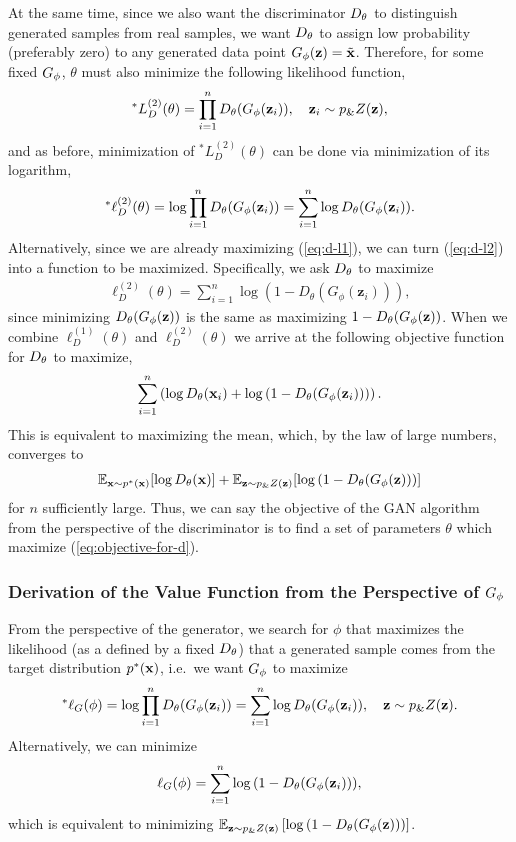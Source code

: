 At the same time, since we also want the discriminator $D_\theta$ to
distinguish generated samples from real samples, we want $D_\theta$ to
assign low probability (preferably zero) to any generated data point
$G_\phi(\mathbf{z}) = \tilde{\mathbf{x}}$.  Therefore, for some fixed $G_\phi$, $\theta$
must also minimize the following likelihood function,
\begin{align}
  ^*L_{D}^{(2)}(\theta) = \prod_{i=1}^n D_\theta(G_\phi(\mathbf{z}_i)), \quad \mathbf{z}_i \sim p_\&Z(\mathbf{z}),
\end{align}
and as before, minimization of $^*L_{D}^{(2)}(\theta)$ can be done via
minimization of its logarithm,
\begin{align}
  \label{eq:d-l2} ^*\ell_{D}^{(2)}(\theta) = \log \prod_{i=1}^n D_\theta(G_\phi(\mathbf{z}_i)) = \sum_{i=1}^n \log D_\theta (G_\phi(\mathbf{z}_i)).
\end{align}
Alternatively, since we are already maximizing (\ref{eq:d-l1}), we can
turn (\ref{eq:d-l2}) into a function to be maximized. Specifically, we
ask $D_\theta$ to maximize
\begin{align}
  \ell_{D}^{(2)}(\theta) = \sum_{i=1}^n \log{(1 - D_\theta(G_\phi(\mathbf{z}_i)))},
\end{align}
since minimizing $D_\theta(G_\phi(\mathbf{z}))$ is the same as maximizing
$1 - D_\theta(G_\phi(\mathbf{z}))$. When we combine $\ell_{D}^{(1)}(\theta)$ and
$\ell_{D}^{(2)}(\theta)$ we arrive at the following objective function
for $D_\theta$ to maximize,
\begin{align}
  \sum_{i=1}^n \left( \log D_\theta(\mathbf{x}_i) + \log{(1 - D_\theta(G_\phi(\mathbf{z}_i)))} \right).
\end{align}
This is equivalent to maximizing the mean, which, by the law of large
numbers, converges to
\begin{align}
  \label{eq:objective-for-d}
  \mathbb{E}_{\mathbf{x} \sim p^*(\mathbf{x})}[{\log D_\theta(\mathbf{x}})] + \mathbb{E}_{\mathbf{z} \sim p_\&Z(\mathbf{z})}[\log{(1 - D_\theta(G_\phi(\mathbf{z})))}]
\end{align}
for $n$ sufficiently large. Thus, we can say the objective of the GAN
algorithm from the perspective of the discriminator is to find a set
of parameters $\theta$ which maximize (\ref{eq:objective-for-d}).

\subsubsection{Derivation of the Value Function from the Perspective of $G_\phi$}
\label{sec:derivation-g}

From the perspective of the generator, we search for $\phi$ that
maximizes the likelihood (as a defined by a fixed $D_\theta$) that a
generated sample comes from the target distribution $p^*(\mathbf{x})$, i.e.\ we
want $G_\phi$ to maximize
\begin{align}
  ^*\ell_G(\phi) = \log\prod_{i=1}^nD_\theta(G_\phi(\mathbf{z}_i)) = \sum_{i=1}^n\log{D_\theta(G_\phi(\mathbf{z}_i))}, \quad \mathbf{z} \sim p_\&Z(\mathbf{z}).
\end{align}
Alternatively, we can minimize
\begin{align}
  \ell_G(\phi) = \sum_{i=1}^n\log{(1 - D_\theta(G_\phi(\mathbf{z}_i)))},
\end{align}
which is equivalent to minimizing $\mathbb{E}_{\mathbf{z} \sim p_\&Z(\mathbf{z})} \left[\log{(1 - D_\theta(G_\phi(\mathbf{z})))} \right]$.

